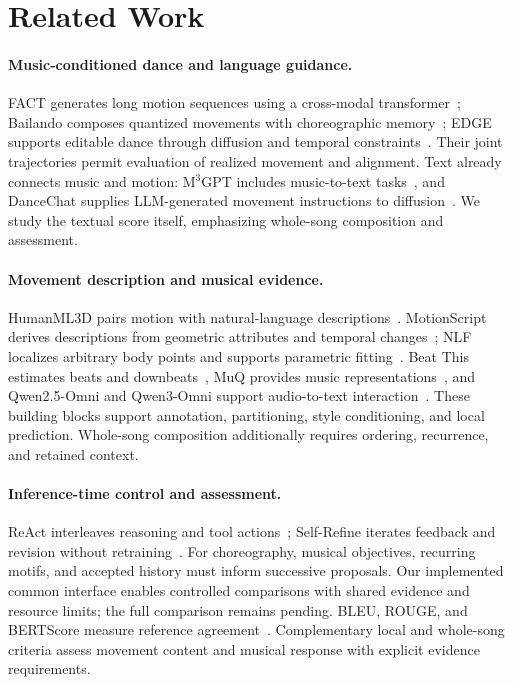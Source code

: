 \section{Related Work}
\label{sec:related-work}
\paragraph{Music-conditioned dance and language guidance.}
FACT generates long motion sequences using a cross-modal
transformer~\cite{aistpp}; Bailando composes quantized movements with
choreographic memory~\cite{bailando}; EDGE supports editable dance through
diffusion and temporal constraints~\cite{edge}. Their joint trajectories
permit evaluation of realized movement and alignment. Text already
connects music and motion: M$^3$GPT includes music-to-text
tasks~\cite{m3gpt}, and DanceChat supplies LLM-generated movement
instructions to diffusion~\cite{dancechat}. We study the textual score
itself, emphasizing whole-song composition and assessment.

\paragraph{Movement description and musical evidence.}
HumanML3D pairs motion with natural-language
descriptions~\cite{humanml3d}. MotionScript derives descriptions from
geometric attributes and temporal changes~\cite{motionscript}; NLF
localizes arbitrary body points and supports parametric
fitting~\cite{nlf}. Beat This estimates beats and
downbeats~\cite{beatthis}, MuQ provides music
representations~\cite{muq}, and Qwen2.5-Omni and Qwen3-Omni support
audio-to-text interaction~\cite{qwen25omni,qwen3omni}. These building
blocks support annotation, partitioning, style conditioning, and local
prediction. Whole-song composition additionally requires ordering,
recurrence, and retained context.

\paragraph{Inference-time control and assessment.}
ReAct interleaves reasoning and tool actions~\cite{react}; Self-Refine
iterates feedback and revision without retraining~\cite{selfrefine}.
For choreography, musical objectives, recurring motifs, and accepted
history must inform successive proposals. Our implemented common
interface enables controlled comparisons with shared evidence and
resource limits; the full comparison remains pending. BLEU, ROUGE, and
BERTScore measure reference agreement~\cite{bleu,rouge,bertscore}.
Complementary local and whole-song criteria assess movement content and
musical response with explicit evidence requirements.
